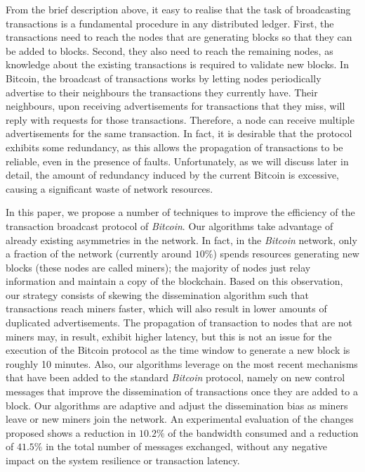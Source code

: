 \documentclass{dads}   %
\begin{document}
From the brief description above, it easy to realise that the task of broadcasting transactions is a fundamental procedure in any distributed ledger. First, the transactions need to reach the nodes that are generating blocks so that they can be added to blocks. Second, they also need to reach the remaining nodes, as knowledge about the existing transactions is required to validate new blocks. In Bitcoin, the broadcast of transactions works by letting nodes periodically advertise to their neighbours the transactions they currently have. Their neighbours, upon receiving advertisements for transactions that they miss, will reply with requests for those transactions. Therefore, a node can receive multiple advertisements for the same transaction. In fact, it is desirable that the protocol exhibits some redundancy, as this allows the propagation of transactions to be reliable, even in the presence of faults. Unfortunately, as we will discuss later in detail, the amount of redundancy induced by the current Bitcoin is excessive, causing a significant waste of network resources.

In this paper, we propose a number of techniques to improve the efficiency of the transaction broadcast protocol of \textit{Bitcoin}. Our algorithms take advantage of already existing asymmetries in the network. In fact, in the \textit{Bitcoin} network, only a fraction of the network (currently around $10\%$) spends resources generating new blocks (these nodes are called miners);  the majority of nodes just relay information and maintain a copy of the blockchain. Based on this observation, our strategy consists of skewing the dissemination algorithm such that transactions reach miners faster, which will also result in lower amounts of duplicated advertisements. The propagation of transaction to nodes that are not miners may, in result, exhibit higher latency, but this is not an issue for the execution of the Bitcoin protocol as the time window to generate a new block is roughly 10 minutes. Also, our algorithms leverage on the most recent mechanisms that have been added to the standard \textit{Bitcoin} protocol, namely on new control messages that improve the dissemination of transactions once they are added to a block. Our algorithms are adaptive and adjust the dissemination bias as miners leave or new miners join the network. An experimental evaluation of the changes proposed shows a reduction in $10.2\%$ of the bandwidth consumed and a reduction of $41.5\%$ in the total number of messages exchanged, without any negative impact on the system resilience or transaction latency.
\end{document}
